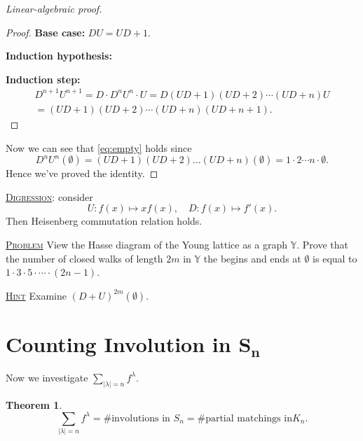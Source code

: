 \documentclass{report}
\newcommand{\fancyem}[1]{\underline{\textsc{#1}}}
\newtheorem{theorem}{Theorem}[section]
\theoremstyle{definition}
\theoremstyle{remark}
\numberwithin{equation}{section}
\newcommand{\fnl}{\parbox[t]{0\linewidth}{}}
\newcommand*\ttlmath[2]{\texorpdfstring{$\boldsymbol{#1}$}{#2}}
\begin{document}
\begin{proof}[Linear-algebraic proof]
\begin{proof}
        \textbf{Base case:} $DU = UD + 1$.
        
        \textbf{Induction hypothesis:}

        \textbf{Induction step:} \begin{multline*}
            D^{n+1}U^{n+1} = D \cdot D^nU^n \cdot U = D(UD + 1)(UD + 2)\cdots(UD + n)U \\
            = (UD + 1)(UD + 2)\cdots(UD + n)(UD + n + 1).
        \end{multline*}
    \end{proof}
    Now we can see that \eqref{eq:empty} holds since \[
        D^nU^n(\emptyset) = (UD + 1)(UD + 2)\ldots(UD + n)(\emptyset) = 1 \cdot 2 \cdots n \cdot \emptyset.
    \] Hence we've proved the identity.
\end{proof}

\fancyem{Digression}: consider \[
    U: f(x) \mapsto xf(x), \quad D: f(x) \mapsto f'(x).  
\] Then Heisenberg commutation relation holds.

\fancyem{Problem} View the Hasse diagram of the Young lattice as a graph $\mathbb Y$. Prove that the number of closed walks of length $2m$ in $\mathbb Y$ the begins and ends at $\emptyset$ is equal to $1 \cdot 3 \cdot 5 \cdot \cdots \cdot (2n - 1)$.

\fancyem{Hint} Examine $(D + U)^{2m}(\emptyset)$.

\section{Counting Involution in \ttlmath{S_n}{S\_n}}
Now we investigate $\sum_{|\lambda| = n} f^\lambda$.

\begin{theorem}\fnl
    \[\sum_{|\lambda| = n} f^\lambda  = \#\text{involutions in } S_n = \#\text{partial matchings in} K_n.
    \]
\end{theorem}
\end{document}
